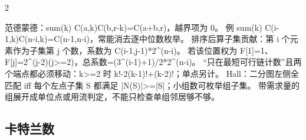 \documentclass[UTF8,fontset=fandol,a4paper,twoside]{ctexart}
\newcommand{\note}[1]{{\fontsize{10}{12}\selectfont #1\par}}
\begin{document}
\begin{multicols}{2}
\note{范德蒙德：sum(\allowbreak{}k)\allowbreak{} C(\allowbreak{}a,\allowbreak{}k)\allowbreak{}C(\allowbreak{}b,\allowbreak{}r-\allowbreak{}k)\allowbreak{}=\allowbreak{}C(\allowbreak{}a+\allowbreak{}b,\allowbreak{}r)\allowbreak{}，越界项为 0。 例 sum(\allowbreak{}k)\allowbreak{} C(\allowbreak{}i-\allowbreak{}1,\allowbreak{}k)\allowbreak{}C(\allowbreak{}n-\allowbreak{}i,\allowbreak{}k)\allowbreak{}=\allowbreak{}C(\allowbreak{}n-\allowbreak{}1,\allowbreak{}n-\allowbreak{}i)\allowbreak{}，常能消去逐中位数枚举。 排序后算子集贡献：第 i 个元素作为子集第 j 个数，系数为 C(\allowbreak{}i-\allowbreak{}1,\allowbreak{}j-\allowbreak{}1)\allowbreak{}*2\textasciicircum{}(\allowbreak{}n-\allowbreak{}i)\allowbreak{}。 若该位置权为 F[\allowbreak{}1]\allowbreak{}=\allowbreak{}1、F[\allowbreak{}j]\allowbreak{}=\allowbreak{}2\textasciicircum{}(\allowbreak{}j-\allowbreak{}2)\allowbreak{}(\allowbreak{}j>\allowbreak{}=\allowbreak{}2)\allowbreak{}，总系数=\allowbreak{}(\allowbreak{}3\textasciicircum{}(\allowbreak{}i-\allowbreak{}1)\allowbreak{}+\allowbreak{}1)\allowbreak{}/\allowbreak{}2*2\textasciicircum{}(\allowbreak{}n-\allowbreak{}i)\allowbreak{}。 “只在最短可行链计数”且两个端点都必须移动：k>\allowbreak{}=\allowbreak{}2 时 k!-\allowbreak{}2(\allowbreak{}k-\allowbreak{}1)\allowbreak{}!+\allowbreak{}(\allowbreak{}k-\allowbreak{}2)\allowbreak{}!；单点另计。 Hall：二分图左侧全匹配 iff 每个左点子集 S 都满足 |N(\allowbreak{}S)\allowbreak{}|>\allowbreak{}=\allowbreak{}|S|；小组数可枚举组子集。 带需求量的组展开成单位点或用流判定，不能只检查单组邻居够不够。}
\subsection{卡特兰数}


\end{multicols}
\end{document}
